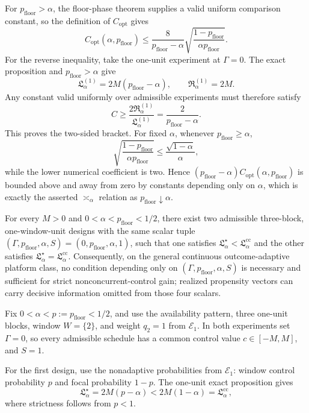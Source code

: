 For \(p_{\mathrm{floor}}>\alpha\), the floor-phase theorem supplies a valid uniform comparison constant, so the definition of \(C_{\mathrm{opt}}\) gives
\[
 C_{\mathrm{opt}}(\alpha,p_{\mathrm{floor}})
 \le\frac{8}{p_{\mathrm{floor}}-\alpha}
 \sqrt{\frac{1-p_{\mathrm{floor}}}{\alpha p_{\mathrm{floor}}}}.
\]
For the reverse inequality, take the one-unit experiment at \(\Gamma=0\).  The exact proposition and \(p_{\mathrm{floor}}>\alpha\) give
\[
 \mathfrak L_\alpha^{(1)}=2M(p_{\mathrm{floor}}-\alpha),
 \qquad
 \mathfrak R_\alpha^{(1)}=2M.
\]
Any constant valid uniformly over admissible experiments must therefore satisfy
\[
 C\ge\frac{2\mathfrak R_\alpha^{(1)}}
 {\mathfrak L_\alpha^{(1)}}
 =\frac{2}{p_{\mathrm{floor}}-\alpha}.
\]
This proves the two-sided bracket.  For fixed \(\alpha\), whenever \(p_{\mathrm{floor}}\ge\alpha\),
\[
 \sqrt{\frac{1-p_{\mathrm{floor}}}{\alpha p_{\mathrm{floor}}}}
 \le\frac{\sqrt{1-\alpha}}{\alpha},
\]
while the lower numerical coefficient is two.  Hence \((p_{\mathrm{floor}}-\alpha)C_{\mathrm{opt}}(\alpha,p_{\mathrm{floor}})\) is bounded above and away from zero by constants depending only on \(\alpha\), which is exactly the asserted \(\asymp_\alpha\) relation as \(p_{\mathrm{floor}}\downarrow\alpha\).

For every \(M>0\) and \(0<\alpha<p_{\mathrm{floor}}<1/2\), there exist two admissible three-block, one-window-unit designs with the same scalar tuple \((\Gamma,p_{\mathrm{floor}},\alpha,S)=(0,p_{\mathrm{floor}},\alpha,1)\), such that one satisfies \(\mathfrak L_\alpha^\star<\mathfrak L_\alpha^{\mathrm{cc}}\) and the other satisfies \(\mathfrak L_\alpha^\star=\mathfrak L_\alpha^{\mathrm{cc}}\).  Consequently, on the general continuous outcome-adaptive platform class, no condition depending only on \((\Gamma,p_{\mathrm{floor}},\alpha,S)\) is necessary and sufficient for strict nonconcurrent-control gain; realized propensity vectors can carry decisive information omitted from those four scalars.

Fix \(0<\alpha<p:=p_{\mathrm{floor}}<1/2\), and use the availability pattern, three one-unit blocks, window \(W=\{2\}\), and weight \(q_2=1\) from \(\mathcal E_1\).  In both experiments set \(\Gamma=0\), so every admissible schedule has a common control value \(c\in[-M,M]\), and \(S=1\).

For the first design, use the nonadaptive probabilities from \(\mathcal E_1\): window control probability \(p\) and focal probability \(1-p\).  The one-unit exact proposition gives
\[
 \mathfrak L_\alpha^\star=2M(p-\alpha)
 <2M(1-\alpha)=\mathfrak L_\alpha^{\mathrm{cc}},
\]
where strictness follows from \(p<1\).

